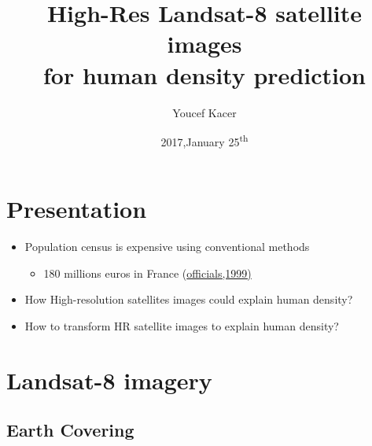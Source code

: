 \documentclass[c]{beamer}
\title[High-Res satellite images for human density prediction]{High-Res Landsat-8 satellite images \\for human density prediction}
\author{Youcef Kacer}
\institute{www.github.com/ykacer}
\date{2017,January 25\textsuperscript{th}}
\begin{document}
\begin{frame}
\titlepage
{}
\end{frame}

\begin{frame}
\tableofcontents
\end{frame}

\section{Presentation}
\begin{frame}
\tableofcontents[currentsection]
\end{frame}

\begin{frame}
\begin{itemize}
\item Population census is expensive using conventional methods\\
  \begin{itemize}
  \item 180 millions euros in France (\href{http://www.assemblee-nationale.fr/13/rap-info/i1246.asp}{officials,1999)}\\ 
  \end{itemize}
\item How High-resolution satellites images could explain human density?\\
\item How to transform HR satellite images to explain human density?\\
\end{itemize}
\end{frame}

\section{Landsat-8 imagery}

\subsection{Earth Covering}
\begin{frame}[label=Covering]
\tableofcontents[currentsubsection]
\end{frame}
\end{document}

